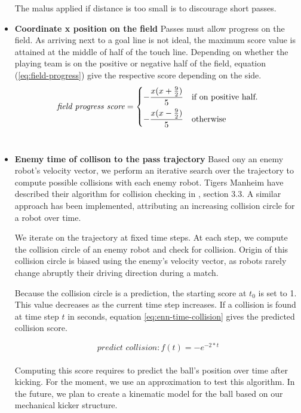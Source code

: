 \begin{itemize}
    The malus applied if distance is too small is to discourage short passes. \\
    
    \item \textbf{Coordinate x position on the field}
    Passes must allow progress on the field. As arriving next to a goal line is not ideal, the maximum score value
    is attained at the middle of half of the touch line. Depending on whether the playing team is on the positive
    or negative half of the field, equation (\ref{eq:field-progress}) give the respective score depending on the side.
    \begin{equation}
        \label{eq:field-progress}
        \textit{field progress score} =
        \begin{dcases}
            -\frac{x (x + \frac{9}{2})}{5} & \text{if on positive half}. \\
            -\frac{x (x - \frac{9}{2})}{5} & \text{otherwise}
        \end{dcases}
    \end{equation} \\

    \item \textbf{Enemy time of collison to the pass trajectory}
    Based ony an enemy robot's velocity vector,
    we perform an iterative search over the trajectory to compute possible collisions with each
    enemy robot. Tigers Manheim have described their algorithm for collision checking in \cite{tdp_tigers_2024}, section 3.3.
    A similar approach has been implemented, attributing an increasing collision circle for a robot over time.

    We iterate on the trajectory at fixed time steps. At each step, we compute the collision circle of an enemy robot
    and check for collision. Origin of this collision circle is biased using the enemy's velocity vector, as robots rarely change
    abruptly their driving direction during a match.

    Because the collision circle is a prediction, the starting score at $t_0$ is set to 1. This value
    decreases as the current time step increases. If a collision is found at time step $t$ in seconds,
    equation \ref{eq:enn-time-collision} gives the predicted collision score.

    \begin{equation}
        \label{eq:enn-time-collision}
        \textit{predict collision}: f(t) = -e^{-2 * t}
    \end{equation} \\

    Computing this score requires to predict the ball's position over time after kicking.
    For the moment, we use an approximation to test this algorithm. In the future, we plan to create
    a kinematic model for the ball based on our mechanical kicker structure.

\end{itemize}

